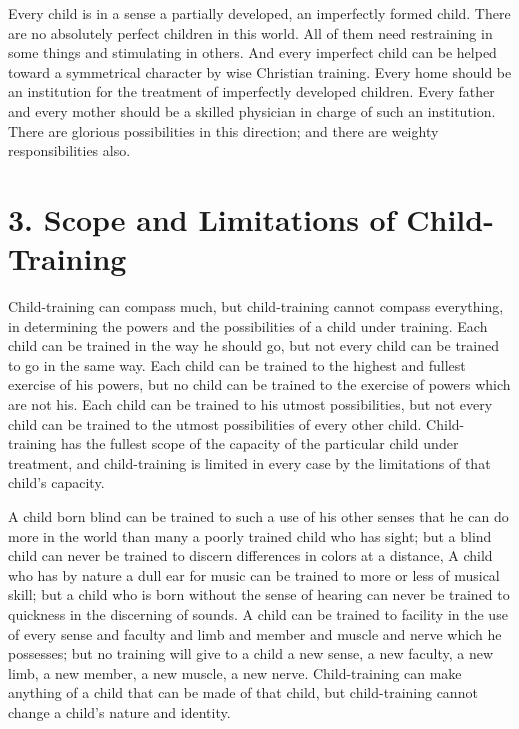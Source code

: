 \documentclass[
]{book}
\begin{document}
Every child is in a sense a partially developed, an imperfectly formed child. There are no absolutely perfect children in this world. All of them need restraining in some things and stimulating in others. And every imperfect child can be helped toward a symmetrical character by wise Christian training. Every home should be an institution for the treatment of imperfectly developed children. Every father and every mother should be a skilled physician in charge of such an institution. There are glorious possibilities in this direction; and there are weighty responsibilities also.

\hypertarget{scope-and-limitations-of-child-training}{%
\chapter{3. Scope and Limitations of Child-Training}\label{scope-and-limitations-of-child-training}}

Child-training can compass much, but child-training cannot compass everything, in determining the powers and the possibilities of a child under training. Each child can be trained in the way he should go, but not every child can be trained to go in the same way. Each child can be trained to the highest and fullest exercise of his powers, but no child can be trained to the exercise of powers which are not his. Each child can be trained to his utmost possibilities, but not every child can be trained to the utmost possibilities of every other child. Child-training has the fullest scope of the capacity of the particular child under treatment, and child-training is limited in every case by the limitations of that child's capacity.

A child born blind can be trained to such a use of his other senses that he can do more in the world than many a poorly trained child who has sight; but a blind child can never be trained to discern differences in colors at a distance, A child who has by nature a dull ear for music can be trained to more or less of musical skill; but a child who is born without the sense of hearing can never be trained to quickness in the discerning of sounds. A child can be trained to facility in the use of every sense and faculty and limb and member and muscle and nerve which he possesses; but no training will give to a child a new sense, a new faculty, a new limb, a new member, a new muscle, a new nerve. Child-training can make anything of a child that can be made of that child, but child-training cannot change a child's nature and identity.
\end{document}
